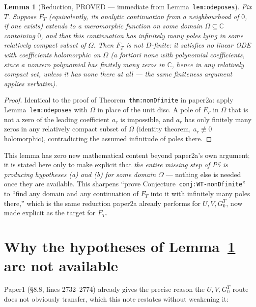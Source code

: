 \documentclass[11pt]{article}
\newtheorem{lemma}[theorem]{Lemma}
\theoremstyle{remark}
\newcommand{\C}{\mathbb C}
\begin{document}
\begin{lemma}[Reduction, PROVED — immediate from Lemma~\texttt{lem:odeposes}]\label{lem:reduction}
Fix $T$. Suppose $F_T$ (equivalently, its analytic continuation from a neighbourhood of $0$, if one
exists) extends to a meromorphic function on some domain $\Omega\subseteq\C$ containing $0$, and that
this continuation has infinitely many poles lying in some relatively compact subset of $\Omega$. Then
$F_T$ is not $D$-finite: it satisfies no linear ODE with coefficients holomorphic on $\Omega$
(a fortiori none with polynomial coefficients, since a nonzero polynomial has finitely many zeros in
$\C$, hence in any relatively compact set, unless it has none there at all — the same finiteness
argument applies verbatim).
\end{lemma}
\begin{proof}
Identical to the proof of Theorem~\texttt{thm:nonDfinite} in paper2a: apply Lemma~\texttt{lem:odeposes}
with $\Omega$ in place of the unit disc. A pole of $F_T$ in $\Omega$ that is not a zero of the leading
coefficient $a_r$ is impossible, and $a_r$ has only finitely many zeros in any relatively compact subset
of $\Omega$ (identity theorem, $a_r\not\equiv0$ holomorphic), contradicting the assumed infinitude of
poles there.
\end{proof}

\noindent This lemma has zero new mathematical content beyond paper2a's own argument; it is stated here
only to make explicit that \emph{the entire missing step of P5 is producing hypotheses (a) and (b) for
some domain $\Omega$} — nothing else is needed once they are available. This sharpens ``prove
Conjecture~\texttt{conj:WT-nonDfinite}'' to ``find any domain and any continuation of $F_T$ into it with
infinitely many poles there,'' which is the same reduction paper2a already performs for $U,V,G^T_0$, now
made explicit as the target for $F_T$.

\section{Why the hypotheses of Lemma~\ref{lem:reduction} are not available}\label{sec:gap}

Paper1 (\S8.8, lines 2732--2774) already gives the precise reason the $U,V,G^T_0$ route does not
obviously transfer, which this note restates without weakening it:
\end{document}
